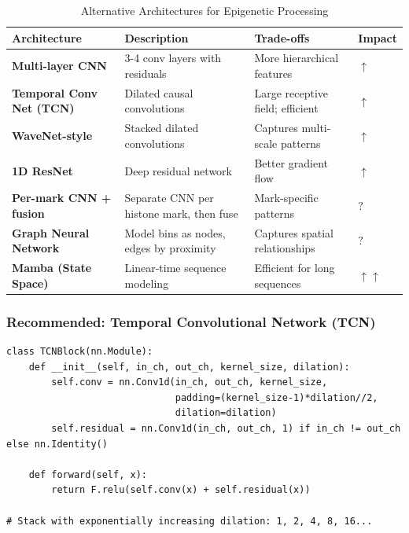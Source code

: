 \documentclass[11pt,a4paper]{article}
\begin{document}
\begin{longtable}{L{3cm}L{4.5cm}L{3.5cm}C{1.5cm}}
\caption{Alternative Architectures for Epigenetic Processing} \\
\toprule
\textbf{Architecture} & \textbf{Description} & \textbf{Trade-offs} & \textbf{Impact} \\
\midrule
\endfirsthead
\bottomrule
\endlastfoot

\textbf{Multi-layer CNN} & 3-4 conv layers with residuals & More hierarchical features & \textcolor{positive}{$\uparrow$} \\

\textbf{Temporal Conv Net (TCN)} & Dilated causal convolutions & Large receptive field; efficient & \textcolor{positive}{$\uparrow$} \\

\textbf{WaveNet-style} & Stacked dilated convolutions & Captures multi-scale patterns & \textcolor{positive}{$\uparrow$} \\

\textbf{1D ResNet} & Deep residual network & Better gradient flow & \textcolor{positive}{$\uparrow$} \\

\textbf{Per-mark CNN + fusion} & Separate CNN per histone mark, then fuse & Mark-specific patterns & \textcolor{uncertain}{$?$} \\

\textbf{Graph Neural Network} & Model bins as nodes, edges by proximity & Captures spatial relationships & \textcolor{uncertain}{$?$} \\

\textbf{Mamba (State Space)} & Linear-time sequence modeling & Efficient for long sequences & \textcolor{positive}{$\uparrow\uparrow$} \\

\end{longtable}

\subsubsection{Recommended: Temporal Convolutional Network (TCN)}

\begin{verbatim}
class TCNBlock(nn.Module):
    def __init__(self, in_ch, out_ch, kernel_size, dilation):
        self.conv = nn.Conv1d(in_ch, out_ch, kernel_size, 
                              padding=(kernel_size-1)*dilation//2,
                              dilation=dilation)
        self.residual = nn.Conv1d(in_ch, out_ch, 1) if in_ch != out_ch else nn.Identity()
    
    def forward(self, x):
        return F.relu(self.conv(x) + self.residual(x))

# Stack with exponentially increasing dilation: 1, 2, 4, 8, 16...
\end{verbatim}
\end{document}
